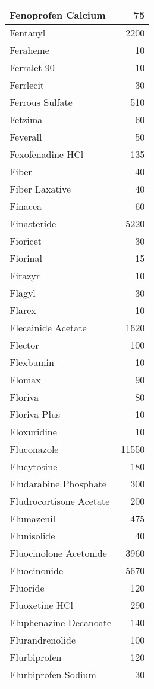 \documentclass[
]{article}
\begin{document}
\begin{table}
\begin{tabular}[t]{l|r}
\hline
Fenoprofen Calcium & 75\\
\hline
Fentanyl & 2200\\
\hline
Feraheme & 10\\
\hline
Ferralet 90 & 10\\
\hline
Ferrlecit & 30\\
\hline
Ferrous Sulfate & 510\\
\hline
Fetzima & 60\\
\hline
Feverall & 50\\
\hline
Fexofenadine HCl & 135\\
\hline
Fiber & 40\\
\hline
Fiber Laxative & 40\\
\hline
Finacea & 60\\
\hline
Finasteride & 5220\\
\hline
Fioricet & 30\\
\hline
Fiorinal & 15\\
\hline
Firazyr & 10\\
\hline
Flagyl & 30\\
\hline
Flarex & 10\\
\hline
Flecainide Acetate & 1620\\
\hline
Flector & 100\\
\hline
Flexbumin & 10\\
\hline
Flomax & 90\\
\hline
Floriva & 80\\
\hline
Floriva Plus & 10\\
\hline
Floxuridine & 10\\
\hline
Fluconazole & 11550\\
\hline
Flucytosine & 180\\
\hline
Fludarabine Phosphate & 300\\
\hline
Fludrocortisone Acetate & 200\\
\hline
Flumazenil & 475\\
\hline
Flunisolide & 40\\
\hline
Fluocinolone Acetonide & 3960\\
\hline
Fluocinonide & 5670\\
\hline
Fluoride & 120\\
\hline
Fluoxetine HCl & 290\\
\hline
Fluphenazine Decanoate & 140\\
\hline
Flurandrenolide & 100\\
\hline
Flurbiprofen & 120\\
\hline
Flurbiprofen Sodium & 30\\

\end{tabular}
\end{table}
\end{document}
